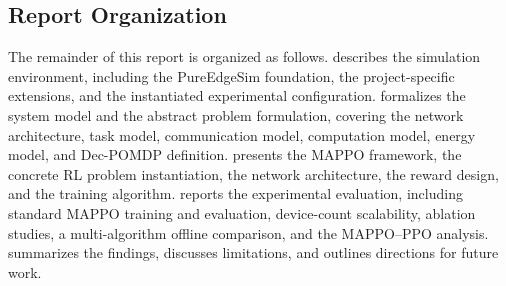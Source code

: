 \begin{table}[htbp]
    \centering
    \footnotesize
    \caption{Comparison of this work with the most closely related studies. PRB/BW action indicates whether the method includes an explicit wireless resource allocation decision.}
    \label{tab:related-work-comparison}
\end{table}

\subsection{Report Organization}
\label{subsec:intro-organization}

The remainder of this report is organized as follows.  describes the simulation environment, including the PureEdgeSim foundation, the project-specific extensions, and the instantiated experimental configuration.  formalizes the system model and the abstract problem formulation, covering the network architecture, task model, communication model, computation model, energy model, and Dec-POMDP definition.  presents the MAPPO framework, the concrete RL problem instantiation, the network architecture, the reward design, and the training algorithm.  reports the experimental evaluation, including standard MAPPO training and evaluation, device-count scalability, ablation studies, a multi-algorithm offline comparison, and the MAPPO--PPO analysis.  summarizes the findings, discusses limitations, and outlines directions for future work.
